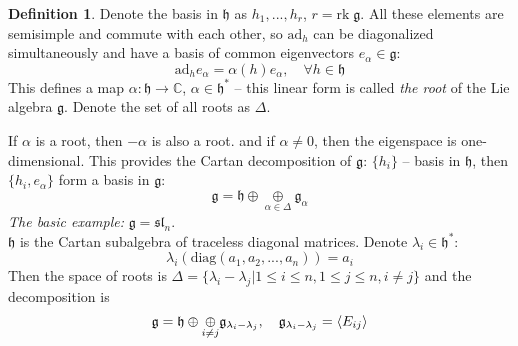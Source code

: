\documentclass[12pt]{article}
\theoremstyle{definition}
\newtheorem{defin}{Definition}[]
\begin{document}
\begin{defin}
    Denote the basis in $\mathfrak{h}$ as $h_1,...,h_r$, $r=\text{rk}\;\mathfrak{g}$. All these elements are semisimple and commute with each other, so $\text{ad}_h$ can be diagonalized simultaneously and have a basis of common eigenvectors $e_\alpha\in\mathfrak{g}$:
    \begin{equation}
        \text{ad}_he_\alpha=\alpha(h)e_\alpha,\quad\forall h\in\mathfrak{h}
    \end{equation}
    This defines a map $\alpha:\mathfrak{h}\rightarrow\mathbb{C}$, $\alpha\in\mathfrak{h}^*$ -- this linear form is called \textit{the root} of the Lie algebra $\mathfrak{g}$. Denote the set of all roots as $\Delta$. 
\end{defin}
If $\alpha$ is a root, then $-\alpha$ is also a root. and if $\alpha\neq0$, then the eigenspace is one-dimensional. This provides the Cartan decomposition of $\mathfrak{g}$: $\{h_i\}$ -- basis in $\mathfrak{h}$, then $\{h_i,e_\alpha\}$ form a basis in $\mathfrak{g}$:
\begin{equation}
    \mathfrak{g}=\mathfrak{h}\oplus\underset{\alpha\in\Delta}{\oplus}\mathfrak{g}_\alpha
\end{equation}
\textit{The basic example:} $\mathfrak{g}=\mathfrak{sl}_n$.\\
$\mathfrak{h}$ is the Cartan subalgebra of traceless diagonal matrices. Denote $\lambda_i\in\mathfrak{h}^*$:
\begin{equation}
    \lambda_i(\text{diag}(a_1,a_2,...,a_n))=a_i
\end{equation}
Then the space of roots is $\Delta=\{\lambda_i-\lambda_j|1\leq i\leq n,1\leq j\leq n, i\neq j\}$ and the decomposition is
\begin{equation}
    \mathfrak{g}=\mathfrak{h}\oplus\underset{i\neq j}{\oplus}\mathfrak{g}_{\lambda_i-\lambda_j},\quad \mathfrak{g}_{\lambda_i-\lambda_j}=\braket{E_{ij}}
\end{equation}
\end{document}
